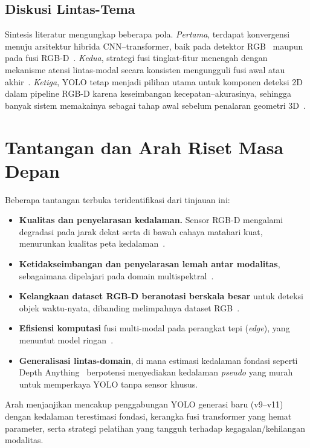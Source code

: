 \documentclass[11pt,a4paper]{article}
\begin{document}
\subsection{Diskusi Lintas-Tema}
Sintesis literatur mengungkap beberapa pola. \emph{Pertama}, terdapat konvergensi
menuju arsitektur hibrida CNN--transformer, baik pada detektor
RGB~\cite{liu2021swin,carion2020detr} maupun pada fusi
RGB-D~\cite{liu2021vst,yin2024dformer}. \emph{Kedua}, strategi fusi tingkat-fitur
menengah dengan mekanisme atensi lintas-modal secara konsisten mengungguli fusi
awal atau akhir~\cite{chen2020sagate,ophoff2019multimodal,cong2022cirnet}.
\emph{Ketiga}, YOLO tetap menjadi pilihan utama untuk komponen deteksi 2D dalam
pipeline RGB-D karena keseimbangan kecepatan--akurasinya, sehingga banyak sistem
memakainya sebagai tahap awal sebelum penalaran geometri
3D~\cite{takahashi2020expandableyolo,tian2023grasp,xu2024onboard,ito2024pumpkin}.

\section{Tantangan dan Arah Riset Masa Depan}
Beberapa tantangan terbuka teridentifikasi dari tinjauan ini:
\begin{itemize}
  \item \textbf{Kualitas dan penyelarasan kedalaman.} Sensor RGB-D mengalami
  degradasi pada jarak dekat serta di bawah cahaya matahari kuat, menurunkan
  kualitas peta kedalaman~\cite{ophoff2019multimodal,lopes2022rgbddatasets}.
  \item \textbf{Ketidakseimbangan dan penyelarasan lemah antar modalitas},
  sebagaimana dipelajari pada domain multispektral~\cite{zhou2020mbnet,zhang2021gaff}.
  \item \textbf{Kelangkaan dataset RGB-D beranotasi berskala besar} untuk deteksi
  objek waktu-nyata, dibanding melimpahnya dataset RGB~\cite{lin2014coco,
  lopes2022rgbddatasets}.
  \item \textbf{Efisiensi komputasi} fusi multi-modal pada perangkat tepi
  (\emph{edge}), yang menuntut model ringan~\cite{seichter2021esanet,li2022yolov6}.
  \item \textbf{Generalisasi lintas-domain}, di mana estimasi kedalaman fondasi
  seperti Depth Anything~\cite{yang2024depthanything} berpotensi menyediakan
  kedalaman \emph{pseudo} yang murah untuk memperkaya YOLO tanpa sensor khusus.
\end{itemize}
Arah menjanjikan mencakup penggabungan YOLO generasi baru (v9--v11) dengan
kedalaman terestimasi fondasi, kerangka fusi transformer yang hemat parameter,
serta strategi pelatihan yang tangguh terhadap kegagalan/kehilangan modalitas.
\end{document}
